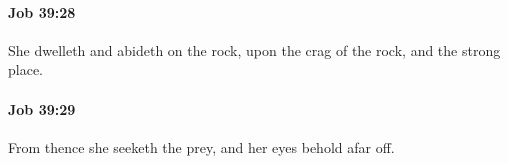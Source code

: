 		\paragraph{Job 39:28} %
			\label{JOB-39-28}

			She dwelleth and abideth on the rock, upon the crag of the rock, and the strong place.


		\paragraph{Job 39:29} %
			\label{JOB-39-29}

			From thence she seeketh the prey, and her eyes behold afar off.


